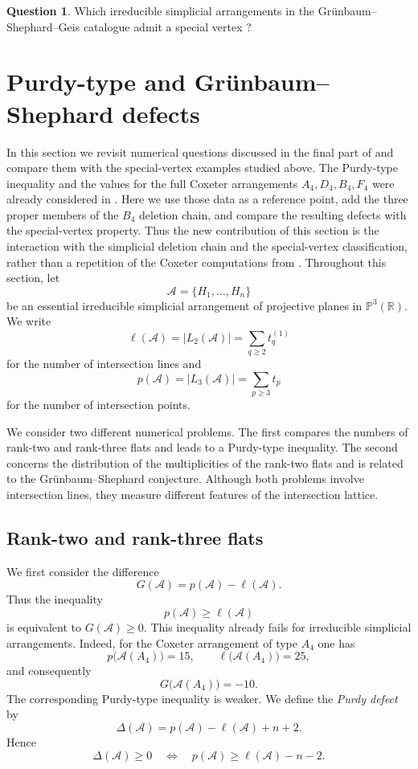 \documentclass[11pt]{article}
\theoremstyle{definition}
\newtheorem{question}[theorem]{Question}
\theoremstyle{remark}
\newcommand{\PP}{\mathbb P}
\newcommand{\RR}{\mathbb R}
\newcommand{\cA}{\mathcal A}
\begin{document}
\begin{question}
Which irreducible simplicial arrangements in the Gr\"unbaum--Shephard--Geis
catalogue \cite{GrunbaumShephard, Geis} admit a special vertex ?
\end{question}


\section{Purdy-type and Gr\"unbaum--Shephard defects}
\label{sec:defects}
In this section we revisit numerical questions discussed in the final part of
\cite{GrunbaumShephard} and compare them with the special-vertex examples
studied above.  The Purdy-type inequality and the values for the full
Coxeter arrangements $A_4,D_4,B_4,F_4$ were already considered in
\cite{MMPP}.  Here we use those data as a reference point, add the three
proper members of the $B_4$ deletion chain, and compare the resulting
defects with the special-vertex property.  Thus the new contribution of
this section is the interaction with the simplicial deletion chain and the
special-vertex classification, rather than a repetition of the Coxeter
computations from \cite{MMPP}.  Throughout this section, let
\[
\cA=\{H_1,\ldots,H_n\}
\]
be an essential irreducible simplicial arrangement of projective planes
in $\PP^3(\RR)$. We write
\[
\ell(\cA)=|L_2(\cA)|
=
\sum_{q\geq2}t_q^{(1)}
\]
for the number of intersection lines and
\[
p(\cA)=|L_3(\cA)|
=
\sum_{p\geq3}t_p
\]
for the number of intersection points.

We consider two different numerical problems. The first compares the
numbers of rank-two and rank-three flats and leads to a Purdy-type
inequality. The second concerns the distribution of the multiplicities
of the rank-two flats and is related to the Gr\"unbaum--Shephard
conjecture. Although both problems involve intersection lines, they
measure different features of the intersection lattice.

\subsection{Rank-two and rank-three flats}

We first consider the difference
\[
G(\cA)=p(\cA)-\ell(\cA).
\]
Thus the inequality
\[
p(\cA)\geq\ell(\cA)
\]
is equivalent to $G(\cA)\geq0$. This inequality already fails for
irreducible simplicial arrangements. Indeed, for the Coxeter arrangement
of type $A_4$ one has
\[
p\bigl(\cA(A_4)\bigr)=15,
\qquad
\ell\bigl(\cA(A_4)\bigr)=25,
\]
and consequently
\[
G\bigl(\cA(A_4)\bigr)=-10.
\]
The corresponding Purdy-type inequality is weaker. We define the
\emph{Purdy defect} by
\[
\Delta(\cA)
=
p(\cA)-\ell(\cA)+n+2.
\]
Hence
\[
\Delta(\cA)\geq0
\quad\Longleftrightarrow\quad
p(\cA)\geq\ell(\cA)-n-2.
\]
\end{document}

